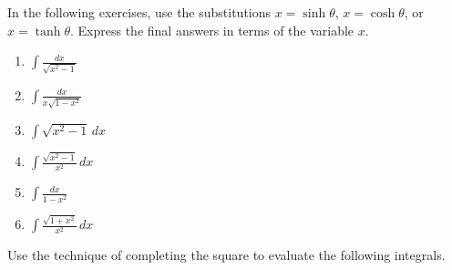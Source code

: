\documentclass{exercises}
\begin{document}
In the following exercises, use the substitutions $x=\sinh \theta$, $x=\cosh \theta$, or $x=\tanh \theta$. Express the final answers in terms of the variable $x$.

\begin{enumerate}[resume]
\item $\int \frac{dx}{\sqrt{x^{2}-1}}$
\item $\int \frac{dx}{x\sqrt{1-x^{2}}}$
\item $\int \sqrt{x^{2}-1}\,dx$
\item $\int \frac{\sqrt{x^{2}-1}}{x^{2}}\,dx$
\item $\int \frac{dx}{1-x^{2}}$
\item $\int \frac{\sqrt{1+x^{2}}}{x^{2}}\,dx$
\end{enumerate}

Use the technique of completing the square to evaluate the following integrals.
\end{document}
